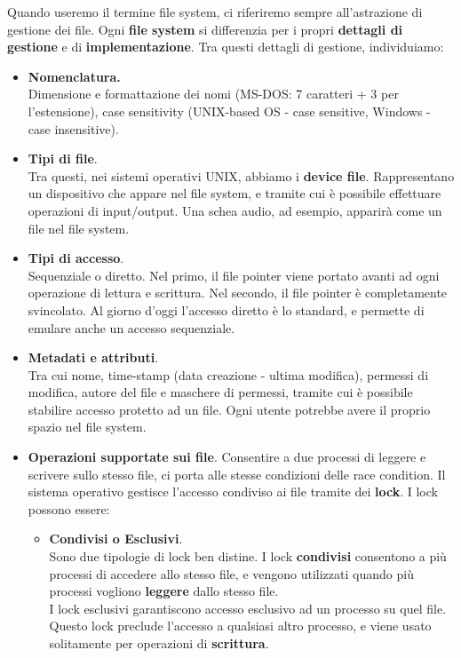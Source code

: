 \documentclass{report}
\begin{document}
Quando useremo il termine file system, ci riferiremo sempre all'astrazione di gestione dei file. Ogni \textbf{file system} si differenzia per i propri \textbf{dettagli di gestione} e di \textbf{implementazione}.
Tra questi dettagli di gestione, individuiamo:
\begin{itemize}
    \item \textbf{Nomenclatura.}\\
    Dimensione e formattazione dei nomi (MS-DOS: 7 caratteri + 3 per l'estensione), case sensitivity (UNIX-based OS - case sensitive, Windows - case insensitive).

    \item \textbf{Tipi di file}.\\
    Tra questi, nei sistemi operativi UNIX, abbiamo i \textbf{device file}. Rappresentano un dispositivo che appare nel file system, e tramite cui è possibile effettuare operazioni di input/output. Una schea audio, ad esempio, apparirà come un file nel file system.
    
    \item \textbf{Tipi di accesso}.\\
    Sequenziale o diretto. Nel primo, il file pointer viene portato avanti ad ogni operazione di lettura e scrittura. Nel secondo, il file pointer è completamente svincolato. Al giorno d'oggi l'accesso diretto è lo standard, e permette di emulare anche un accesso sequenziale.
    \item \textbf{Metadati e attributi}.\\
    Tra cui nome, time-stamp (data creazione - ultima modifica), permessi di modifica, autore del file e maschere di permessi, tramite cui è possibile stabilire accesso protetto ad un file. Ogni utente potrebbe avere il proprio spazio nel file system.
    \item \textbf{Operazioni supportate sui file}.
    Consentire a due processi di leggere e scrivere sullo stesso file, ci porta alle stesse condizioni delle race condition. Il sistema operativo gestisce l'accesso condiviso ai file tramite dei \textbf{lock}. I lock possono essere:
    \begin{itemize}
        \item \textbf{Condivisi o Esclusivi}.\\
        Sono due tipologie di lock ben distine. I lock \textbf{condivisi} consentono a più processi di accedere allo stesso file, e vengono utilizzati quando più processi vogliono \textbf{leggere} dallo stesso file.\\
        I lock esclusivi garantiscono accesso esclusivo ad un processo su quel file. Questo lock preclude l'accesso a qualsiasi altro processo, e viene usato solitamente per operazioni di \textbf{scrittura}.


\end{itemize}
\end{itemize}
\end{document}
